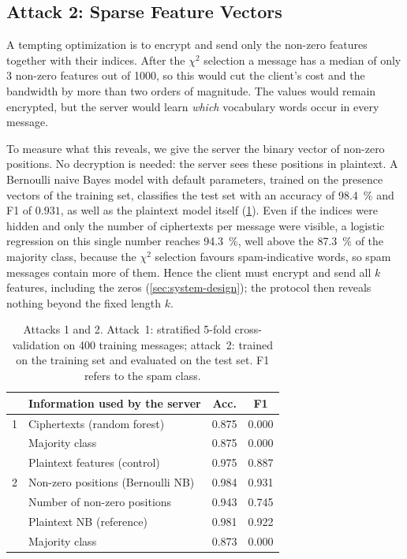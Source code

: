 \subsection{Attack 2: Sparse Feature Vectors}\label{sec:attack-sparse}

A tempting optimization is to encrypt and send only the non-zero features together with their indices.
After the $\chi^2$ selection a message has a median of only 3 non-zero features out of \num{1000}, so this would cut the client's cost and the bandwidth by more than two orders of magnitude.
The values would remain encrypted, but the server would learn \emph{which} vocabulary words occur in every message.

To measure what this reveals, we give the server the binary vector of non-zero positions.
No decryption is needed: the server sees these positions in plaintext.
A Bernoulli naive Bayes model with default parameters, trained on the presence vectors of the training set, classifies the test set with an accuracy of \SI{98.4}{\percent} and F1 of $0.931$, as well as the plaintext model itself (\cref{tab:attacks}).
Even if the indices were hidden and only the number of ciphertexts per message were visible, a logistic regression on this single number reaches \SI{94.3}{\percent}, well above the \SI{87.3}{\percent} of the majority class, because the $\chi^2$ selection favours spam-indicative words, so spam messages contain more of them.
Hence the client must encrypt and send all $k$ features, including the zeros (\cref{sec:system-design}); the protocol then reveals nothing beyond the fixed length $k$.

\begin{table}[htbp]
  \centering
  \caption{Attacks 1 and 2. Attack~1: stratified 5-fold cross-validation on 400 training messages; attack~2: trained on the training set and evaluated on the test set. F1 refers to the spam class.}
  \label{tab:attacks}
  \begin{tabular}{@{}llcc@{}}
    \toprule
    & Information used by the server & Acc. & F1 \\
    \midrule
    1 & Ciphertexts (random forest) & 0.875 & 0.000 \\
      & Majority class & 0.875 & 0.000 \\
      & Plaintext features (control) & 0.975 & 0.887 \\
    \midrule
    2 & Non-zero positions (Bernoulli NB) & 0.984 & 0.931 \\
      & Number of non-zero positions & 0.943 & 0.745 \\
      & Plaintext NB (reference) & 0.981 & 0.922 \\
      & Majority class & 0.873 & 0.000 \\
    \bottomrule
  \end{tabular}
\end{table}

